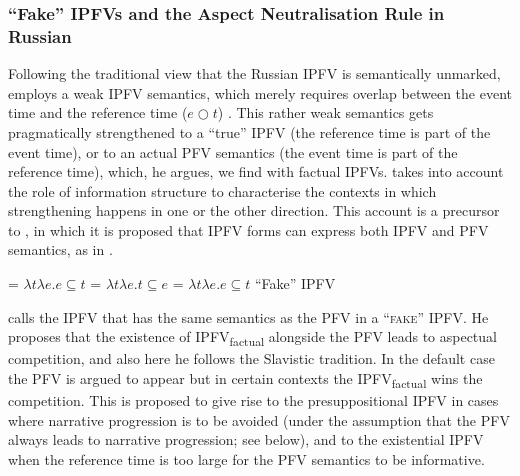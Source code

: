 \documentclass[output=paper,colorlinks,citecolor=brown]{langscibook}
\begin{document}
\subsubsection{``Fake'' IPFVs and the Aspect Neutralisation Rule in Russian}
\label{sec:gronn}

Following the traditional view that the Russian IPFV is semantically unmarked, \citet{gronndiss} employs a weak IPFV semantics, which merely requires overlap between the event time and the reference time ($e \bigcirc t$) \citep[building on][]{Klein1995}. This rather weak semantics gets pragmatically strengthened to a ``true'' IPFV (the reference time is part of the event time), or to an actual PFV semantics (the event time is part of the reference time), which, he argues, we find with factual IPFVs. \citeauthor{gronndiss} takes into account the role of information structure to characterise the contexts in which strengthening happens in one or the other direction. This account is a precursor to \citet{gronn15}, in which it is proposed that IPFV forms can express both IPFV and PFV semantics, as in .

\ea\label{ex:gronn15PFIPF} 
\ea {} = $\lambda t \lambda e. e \subseteq t$
\ex {} = $\lambda t \lambda e. t \subseteq e$
\ex\label{ex:fakeipf}
 = $\lambda t \lambda e. e \subseteq t$ \hspace{1em} ``Fake'' IPFV
\z 
\z 

\noindent \citeauthor{gronn15} calls the IPFV that has the same semantics as the PFV in  a \textsc{``fake'' IPFV}. He proposes that the existence of IPFV\textsubscript{factual} alongside the PFV leads to aspectual competition, and also here he follows the Slavistic tradition. In the default case the PFV is argued to appear but in certain contexts the IPFV\textsubscript{factual} wins the competition. This is proposed to give rise to the presuppositional IPFV in cases where narrative progression is to be avoided (under the assumption that the PFV always leads to narrative progression; see below), and to the existential IPFV when the reference time is too large for the PFV semantics to be informative. 
\end{document}
